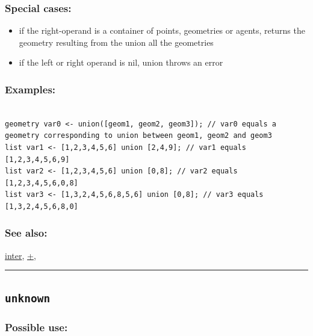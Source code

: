 \documentclass[]{book}
\providecommand{\tightlist}{%
  \setlength{\itemsep}{0pt}\setlength{\parskip}{0pt}}
\theoremstyle{definition}
\theoremstyle{definition}
\theoremstyle{definition}
\theoremstyle{remark}
\begin{document}
\subsubsection{Special cases:}\label{special-cases-142}

\begin{itemize}
\tightlist
\item
  if the right-operand is a container of points, geometries or agents,
  returns the geometry resulting from the union all the geometries\\
\item
  if the left or right operand is nil, union throws an error
\end{itemize}

\subsubsection{Examples:}\label{examples-373}

\begin{verbatim}
 
geometry var0 <- union([geom1, geom2, geom3]); // var0 equals a geometry corresponding to union between geom1, geom2 and geom3 
list var1 <- [1,2,3,4,5,6] union [2,4,9]; // var1 equals [1,2,3,4,5,6,9] 
list var2 <- [1,2,3,4,5,6] union [0,8]; // var2 equals [1,2,3,4,5,6,0,8] 
list var3 <- [1,3,2,4,5,6,8,5,6] union [0,8]; // var3 equals [1,3,2,4,5,6,8,0]
\end{verbatim}

\subsubsection{See also:}\label{see-also-214}

\href{operators-i-to-m.html\#inter}{inter},
\href{operators-a-to-a.html\#+}{+},

\begin{center}\rule{0.5\linewidth}{\linethickness}\end{center}

\subsection{\texorpdfstring{\texttt{unknown}}{unknown}}\label{unknown}

\subsubsection{Possible use:}\label{possible-use-539}
\end{document}
